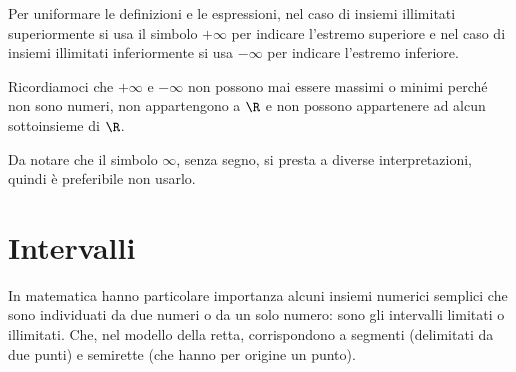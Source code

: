 \vspace{.5em}
Per uniformare le definizioni e le espressioni, nel caso di insiemi 
illimitati superiormente si usa il simbolo \(+\infty\) 
per indicare l'estremo superiore e 
nel caso di insiemi illimitati inferiormente si usa \(-\infty\) 
per indicare l'estremo inferiore.

Ricordiamoci che \(+\infty\) e \(-\infty\) non possono mai essere 
massimi o minimi perché non sono numeri, non appartengono a \(\R\) 
e non possono appartenere ad alcun sottoinsieme di \(\R\).

\begin{newoss}{}{}
Da notare che il simbolo \(\infty\), senza segno, si presta a diverse 
interpretazioni, quindi è preferibile non usarlo.
\end{newoss}

\section{Intervalli}
\label{sec:topologiaintervalli}

% 
% 

In matematica hanno particolare importanza alcuni insiemi numerici semplici 
che sono individuati da due numeri o da un solo numero: sono gli intervalli 
limitati o illimitati.
Che, nel modello della retta, corrispondono a segmenti (delimitati da due 
punti) e semirette (che hanno per origine un punto).

\vspace{.5em}

